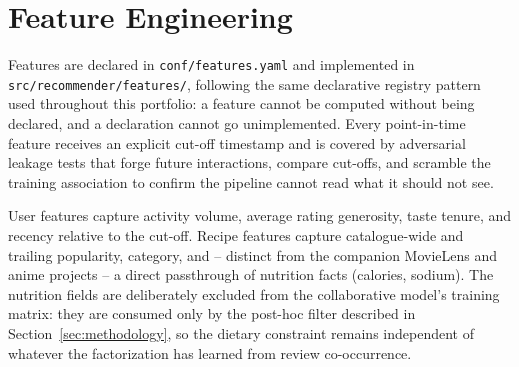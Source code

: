 \section{Feature Engineering}
Features are declared in \texttt{conf/features.yaml} and implemented in
\texttt{src/recommender/features/}, following the same declarative
registry pattern used throughout this portfolio: a feature cannot be
computed without being declared, and a declaration cannot go unimplemented.
Every point-in-time feature receives an explicit cut-off timestamp and is
covered by adversarial leakage tests that forge future interactions,
compare cut-offs, and scramble the training association to confirm the
pipeline cannot read what it should not see.



User features capture activity volume, average rating generosity, taste
tenure, and recency relative to the cut-off. Recipe features capture
catalogue-wide and trailing popularity, category, and -- distinct from the
companion MovieLens and anime projects -- a direct passthrough of nutrition
facts (calories, sodium). The nutrition fields are deliberately excluded
from the collaborative model's training matrix: they are consumed only by
the post-hoc filter described in Section~\ref{sec:methodology}, so the
dietary constraint remains independent of whatever the factorization has
learned from review co-occurrence.


